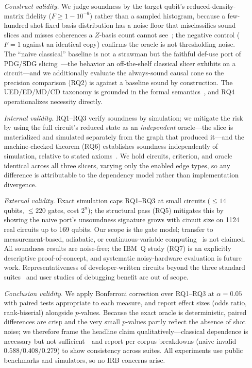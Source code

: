 \documentclass[10pt,conference]{IEEEtran}
\theoremstyle{definition}
\begin{document}
\emph{Construct validity.} We judge soundness by the target qubit's reduced-density-matrix fidelity ($F\ge 1-10^{-6}$) rather than a sampled histogram, because a few-hundred-shot fixed-basis distribution has a noise floor that misclassifies sound slices and misses coherences a $Z$-basis count cannot see~\cite{nielsen2010quantum, gong2023learning}; the negative control ($F=1$ against an identical copy) confirms the oracle is not thresholding noise. The ``naive classical'' baseline is not a strawman but the faithful def-use port of PDG/SDG slicing~\cite{ferrante1987pdg, horwitz1990interprocedural}---the behavior an off-the-shelf classical slicer exhibits on a circuit---and we additionally evaluate the always-sound causal cone so the precision comparison (RQ2) is against a baseline sound by construction. The UED/ED/MD/CD taxonomy is grounded in the formal semantics~\cite{horodecki2009entanglement, heim2020quantum}, and RQ4 operationalizes necessity directly.

\emph{Internal validity.} RQ1--RQ3 verify soundness by simulation; we mitigate the risk by using the full circuit's reduced state as an \emph{independent} oracle---the slice is materialized and simulated separately from the graph that produced it---and the machine-checked theorem (RQ6) establishes soundness independently of simulation, relative to stated axioms~\cite{blazy2015verified}. We hold circuits, criterion, and oracle identical across all three slicers, varying only the enabled edge types, so any difference is attributable to the dependency model rather than implementation divergence.

\emph{External validity.} Exact simulation caps RQ1--RQ3 at small circuits ($\le 14$ qubits, $\le 220$ gates, cost $2^n$); the structural pass (RQ5) mitigates this by showing the naive port's unsoundness signature grows with circuit size on 1124 real circuits up to 169 qubits. Our scope is the gate model; transfer to measurement-based, adiabatic, or continuous-variable computing~\cite{danos2007distributed} is not claimed. All soundness results are noise-free; the IBM~Q study (RQ7) is an explicitly descriptive proof-of-concept, and systematic noisy-hardware evaluation is future work. Representativeness of developer-written circuits beyond the three standard suites~\cite{cross2022openqasm3} and user studies of debugging benefit are out of scope.

\emph{Conclusion validity.} We apply Bonferroni correction over RQ1--RQ3 at $\alpha=0.05$ with paired tests appropriate to each measure, and report effect sizes (odds ratio, rank-biserial) alongside $p$-values. Because the exact oracle is deterministic, paired differences are crisp and the very small $p$-values partly reflect the absence of shot noise; we therefore frame the headline claim qualitatively---classical dependence is necessary but not sufficient---and report per-corpus breakdowns (naive invalid $0.588$/$0.408$/$0.279$) to show consistency across suites. All experiments use public benchmarks and simulators, so no IRB concerns arise.
\end{document}
